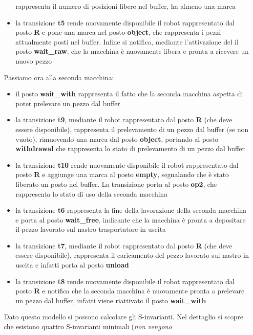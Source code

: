 \documentclass[a4paper,12pt, oneside]{book}
\begin{document}
\begin{esempio}
\begin{itemize}
    rappresenta il numero di posizioni libere nel buffer, ha almeno una marca
    \item la transizione \textbf{t5} rende nuovamente disponibile il robot
    rappresentato dal posto \textbf{R} e pone una marca nel posto
    \textbf{object}, che rappresenta i pezzi attualmente posti nel
    buffer. Infine si notifica, mediante l'attivazione del il posto
    \textbf{wait\_raw}, che la macchina è nuovamente libera e pronta a ricevere
    un nuovo pezzo
  \end{itemize}
  Passiamo ora alla seconda macchina:
  \begin{itemize}
    \item il posto \textbf{wait\_with} rappresenta il fatto che la seconda
    macchina aspetta di poter prelevare un pezzo dal buffer
    \item la transizione \textbf{t9}, mediante il robot rappresentato dal posto
    \textbf{R} (che deve essere disponibile), rappresenta il prelevamento di un
    pezzo dal buffer (se non vuoto), rimuovendo una marca dal posto
    \textbf{object}, portando al posto \textbf{withdrawal} che rappresenta lo
    stato di prelevamento di un pezzo dal buffer
    \item la transizione \textbf{t10} rende nuovamente disponibile il robot
    rappresentato dal posto \textbf{R} e aggiunge una marca al posto
    \textbf{empty}, segnalando che è stato liberato un posto nel buffer. La
    transizione porta al posto \textbf{op2}, che rappresenta lo stato di uso
    della seconda macchina
    \item la transizione \textbf{t6} rappresenta la fine della lavorazione della
    seconda macchina e porta al posto \textbf{wait\_free}, indicante che la
    macchina è pronta a depositare il pezzo lavorato sul nastro trasportatore in
    uscita
    \item la transizione \textbf{t7}, mediante il robot rappresentato dal posto
    \textbf{R} (che deve essere disponibile), rappresenta il caricamento del
    pezzo lavorato sul nastro in uscita e infatti porta al posto \textbf{unload}
    \item la transizione \textbf{t8} rende nuovamente disponibile il robot
    rappresentato dal posto \textbf{R} e notifica che la seconda macchina è
    nuovamente pronta a prelevare un pezzo dal buffer, infatti viene riattivato
    il posto \textbf{wait\_with}
  \end{itemize}
  Dato questo modello si possono calcolare gli S-invarianti. Nel dettaglio
  si scopre che esistono quattro S-invarianti minimali (\textit{non vengono
}
\end{esempio}
\end{document}
